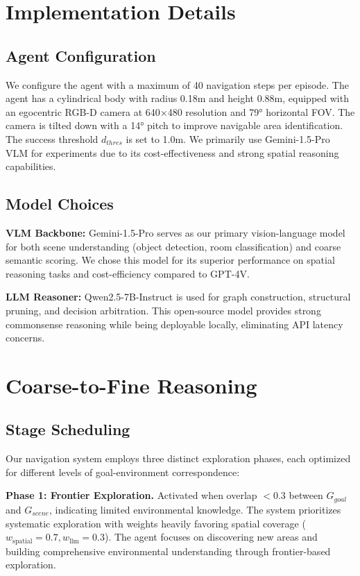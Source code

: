 \documentclass{article}
\begin{document}
\section{Implementation Details}
\label{app:implementation}

\subsection{Agent Configuration}
We configure the agent with a maximum of 40 navigation steps per episode. The agent has a cylindrical body with radius 0.18m and height 0.88m, equipped with an egocentric RGB-D camera at 640×480 resolution and 79° horizontal FOV. The camera is tilted down with a 14° pitch to improve navigable area identification. The success threshold $d_{thres}$ is set to 1.0m. We primarily use Gemini-1.5-Pro VLM for experiments due to its cost-effectiveness and strong spatial reasoning capabilities.

\subsection{Model Choices}
\textbf{VLM Backbone:} Gemini-1.5-Pro serves as our primary vision-language model for both scene understanding (object detection, room classification) and coarse semantic scoring. We chose this model for its superior performance on spatial reasoning tasks and cost-efficiency compared to GPT-4V.

\textbf{LLM Reasoner:} Qwen2.5-7B-Instruct is used for graph construction, structural pruning, and decision arbitration. This open-source model provides strong commonsense reasoning while being deployable locally, eliminating API latency concerns.

\section{Coarse-to-Fine Reasoning}
\label{app:multistage}

\subsection{Stage Scheduling}

Our navigation system employs three distinct exploration phases, each optimized for different levels of goal-environment correspondence:

\textbf{Phase 1: Frontier Exploration.} Activated when overlap $< 0.3$ between $G_{goal}$ and $G_{scene}$, indicating limited environmental knowledge. The system prioritizes systematic exploration with weights heavily favoring spatial coverage ($w_{\text{spatial}}=0.7, w_{\text{llm}}=0.3$). The agent focuses on discovering new areas and building comprehensive environmental understanding through frontier-based exploration.
\end{document}
